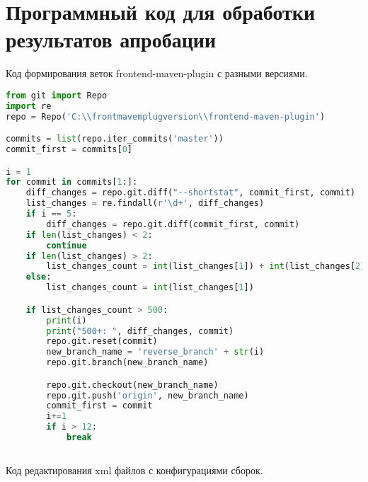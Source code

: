 \chapter{Программный код для обработки результатов апробации}\label{appendix-extra-examples}

Код формирования веток frontend-maven-plugin с разными версиями.

\begin{lstlisting}[language=Python]
from git import Repo
import re
repo = Repo('C:\\frontmavemplugversion\\frontend-maven-plugin')

commits = list(repo.iter_commits('master'))
commit_first = commits[0]

i = 1
for commit in commits[1:]:
    diff_changes = repo.git.diff("--shortstat", commit_first, commit)
    list_changes = re.findall(r'\d+', diff_changes)
    if i == 5:
        diff_changes = repo.git.diff(commit_first, commit)
    if len(list_changes) < 2:
        continue
    if len(list_changes) > 2:
        list_changes_count = int(list_changes[1]) + int(list_changes[2])
    else:
        list_changes_count = int(list_changes[1])

    if list_changes_count > 500:
        print(i)
        print("500+: ", diff_changes, commit)
        repo.git.reset(commit)
        new_branch_name = 'reverse_branch' + str(i)
        repo.git.branch(new_branch_name)

        repo.git.checkout(new_branch_name)
        repo.git.push('origin', new_branch_name)
        commit_first = commit
        i+=1
        if i > 12:
            break
   
\end{lstlisting}

Код редактирования xml файлов с конфигурациями сборок.

